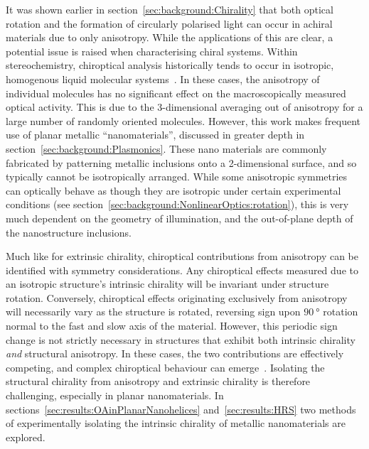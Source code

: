 It was shown earlier in section~\ref{sec:background:Chirality} that both optical rotation and the formation of circularly polarised light can occur in achiral materials due to only anisotropy. 
While the applications of this are clear, a potential issue is raised when characterising chiral systems. 
Within stereochemistry, chiroptical analysis historically tends to occur in isotropic, homogenous liquid molecular systems~\cite{Berova2012a}. In these cases, the anisotropy of individual molecules has no significant effect on the macroscopically measured optical activity. This is due to the 3-dimensional averaging out of anisotropy for a large number of randomly oriented molecules. 
However, this work makes frequent use of planar metallic ``nanomaterials'', discussed in greater depth in section~\ref{sec:background:Plasmonics}. These nano materials are commonly fabricated by patterning metallic inclusions onto a 2-dimensional surface, and so typically cannot be isotropically arranged. While some anisotropic symmetries can optically behave as though they are isotropic under certain experimental conditions (see section~\ref{sec:background:NonlinearOptics:rotation}), this is very much dependent on the geometry of illumination, and the out-of-plane depth of the nanostructure inclusions.

Much like for extrinsic chirality, chiroptical contributions from anisotropy can be identified with symmetry considerations. Any chiroptical effects measured due to an isotropic structure's intrinsic chirality will be invariant under structure rotation. Conversely, chiroptical effects originating exclusively from anisotropy will necessarily vary as the structure is rotated, reversing sign upon $\SI{90}{\degree}$ rotation normal to the fast and slow axis of the material. However, this periodic sign change is not strictly necessary in structures that exhibit both intrinsic chirality \textit{and} structural anisotropy. In these cases, the two contributions are effectively competing, and complex chiroptical behaviour can emerge~\cite{Hooper2017}. Isolating the structural chirality from anisotropy and extrinsic chirality is therefore challenging, especially in planar nanomaterials. In sections~\ref{sec:results:OAinPlanarNanohelices} and~\ref{sec:results:HRS} two methods of experimentally isolating the intrinsic chirality of metallic nanomaterials are explored.



